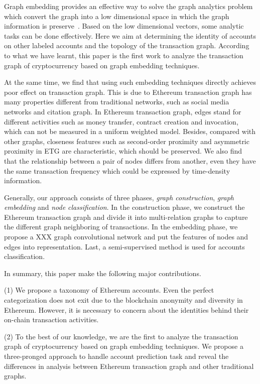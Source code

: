  Graph embedding provides an effective way to solve the graph analytics problem which convert the graph into a low dimensional space in which the graph information is preserve~\cite{cai2018comprehensive}. Based on the low dimensional vectors, some analytic tasks can be done effectively. Here we aim at determining the identity of accounts on other labeled accounts and the topology of the transaction graph. According to what we have learnt, this paper is the first work to analyze the transaction graph of cryptocurrency based on graph embedding techniques.

At the same time, we find that using such embedding techniques directly achieves poor effect on transaction graph. This is due to Ethereum transaction graph has many properties different from traditional networks, such as social media networks and citation graph. In Ethereum transaction graph, edges stand for different activities such as money transfer, contract creation and invocation, which can not be measured in a uniform weighted model. Besides, compared with other graphs, closeness features such as second-order proximity and asymmetric proximity in ETG are characteristic, which should be preserved. We also find that the relationship between a pair of nodes differs from another, even they have the same transaction frequency which could be expressed by time-density information.

Generally, our approach consists of three phases, \emph{graph construction}, \emph{graph embedding} and \emph{node classification}. In the construction phase, we construct the Ethereum transaction graph and divide it into multi-relation graphs to capture the different graph neighboring of transactions. In the embedding phase, we propose a XXX graph convolutional network and put the features of nodes and edges into representation. Last, a semi-supervised method is used for accounts classification.

In summary, this paper make the following major contributions.

(1) We propose a taxonomy of Ethereum accounts. Even the perfect categorization does not exit due to the blockchain anonymity and diversity in Ethereum. However, it is necessary to concern about the identities behind their on-chain transaction activities.

(2) To the best of our knowledge, we are the first to analyze the transaction graph of cryptocurrency based on graph embedding techniques. We propose a three-pronged approach to handle account prediction task and reveal the differences in analysis between Ethereum transaction graph and other traditional graphs.

